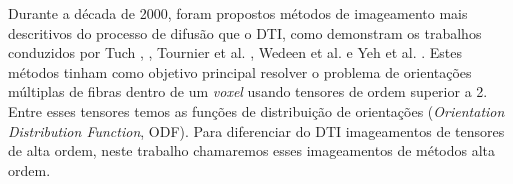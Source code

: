 \documentclass[
    12pt,                %
    oneside,            %
    a4paper,            %
    english,            %
    french,                %
    spanish,            %
    brazil                %
    ]{abntex2}
\begin{document}









%











Durante a década de 2000, foram propostos métodos de imageamento mais descritivos do processo de difusão que o DTI, como demonstram os trabalhos conduzidos por Tuch \cite{tuch2002}, \cite{TuchQBall2004}, Tournier et al. \cite{tournier2007}, Wedeen et al. \cite{wedeen2005} e Yeh et al. \cite{yeh2010}. Estes métodos tinham como objetivo principal resolver o problema de orientações múltiplas de fibras dentro de um \textit{voxel} usando tensores de ordem superior a 2. Entre esses tensores temos as funções de distribuição de orientações (\textit{Orientation Distribution Function}, ODF). Para diferenciar do DTI imageamentos de tensores de alta ordem, neste trabalho chamaremos esses imageamentos de \textsf{métodos alta ordem}.
\end{document}

